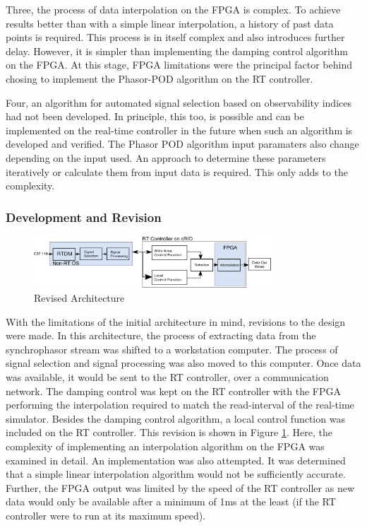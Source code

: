 \documentclass[conference]{IEEEtran}
\begin{document}
Three, the process of data interpolation on the FPGA is complex. To achieve results better than with a simple linear interpolation, a history of past data points is required. This process is in itself complex and also introduces further delay. However, it is simpler than implementing the damping control algorithm on the FPGA. At this stage, FPGA limitations were the principal factor behind chosing to implement the Phasor-POD algorithm on the RT controller.

Four, an algorithm for automated signal selection based on observability indices had not been developed. In principle, this too, is possible and can be implemented on the real-time controller in the future when such an algorithm is developed and verified. The Phasor POD algorithm input paramaters also change depending on the input used. An approach to determine these parameters iteratively or calculate them from input data is required. This only adds to the complexity.

\subsubsection{Development and Revision}
\begin{figure}[!b]
\centering
\includegraphics[width=3.5in]{Revision.png}
\caption{Revised Architecture}
\label{fig:Revision}
\end{figure}

With the limitations of the initial architecture in mind, revisions to the design were made. In this architecture, the process of  extracting data from the synchrophasor stream was shifted to a workstation computer. The process of signal selection and signal processing was also moved to this computer. Once data was available, it would be sent to the RT controller, over a communication network. The damping control was kept on the RT controller with the FPGA performing the interpolation required to match the read-interval of the real-time simulator. Besides the damping control algorithm, a local control function was included on the RT controller. This revision is shown in Figure \ref{fig:Revision}. Here, the complexity of implementing an interpolation algorithm on the FPGA was examined in detail. An implementation was also attempted. It was determined that a simple linear interpolation algorithm would not be sufficiently accurate. Further, the FPGA output was limited by the speed of the RT controller as new data would only be available after a minimum of 1ms at the least (if the RT controller were to run at its maximum speed). 
\end{document}
